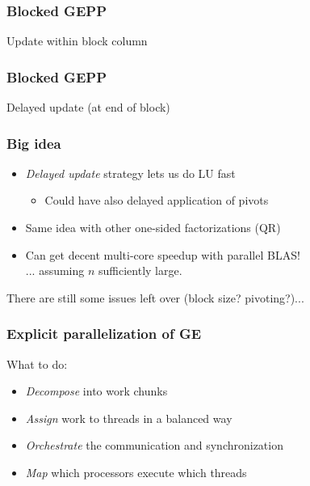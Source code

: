 \documentclass{beamer}
\begin{document}
\begin{frame}
  \frametitle{Blocked GEPP}
  
  \begin{center}
    
    Update within block column
  \end{center}
\end{frame}


\begin{frame}
  \frametitle{Blocked GEPP}

  \begin{center}
    
    Delayed update (at end of block)
  \end{center}  
\end{frame}


\begin{frame}
  \frametitle{Big idea}
  
  \begin{itemize}
  \item {\em Delayed update} strategy lets us do LU fast
    \begin{itemize}
    \item Could have also delayed application of pivots
    \end{itemize}
  \item Same idea with other one-sided factorizations (QR)
  \item Can get decent multi-core speedup with parallel BLAS! \\
    ... assuming $n$ sufficiently large.
  \end{itemize}
  There are still some issues left over (block size? pivoting?)...
\end{frame}

\begin{frame}
  \frametitle{Explicit parallelization of GE}

  What to do:
  \begin{itemize}
  \item {\em Decompose} into work chunks
  \item {\em Assign} work to threads in a balanced way
  \item {\em Orchestrate} the communication and synchronization
  \item {\em Map} which processors execute which threads
  \end{itemize}
\end{frame}
\end{document}
